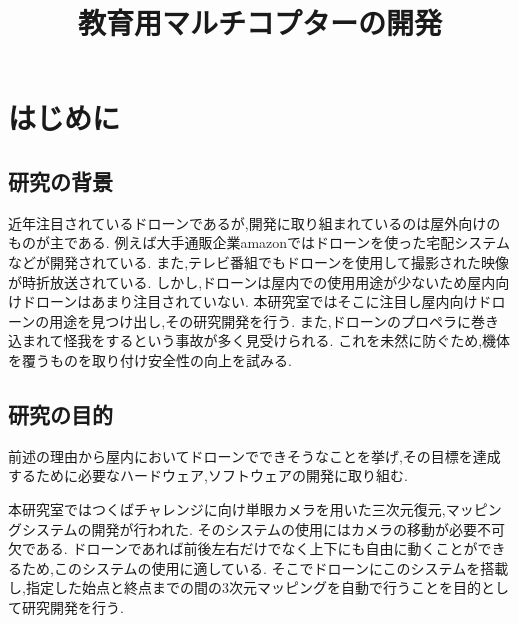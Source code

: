 \documentclass[a4paper]{jarticle}
\begin{document}
\title{教育用マルチコプターの開発}

\maketitle
\section{はじめに}

\subsection{研究の背景}
近年注目されているドローンであるが,開発に取り組まれているのは屋外向けのものが主である.
例えば大手通販企業amazonではドローンを使った宅配システムなどが開発されている.
また,テレビ番組でもドローンを使用して撮影された映像が時折放送されている.
しかし,ドローンは屋内での使用用途が少ないため屋内向けドローンはあまり注目されていない.
本研究室ではそこに注目し屋内向けドローンの用途を見つけ出し,その研究開発を行う.
また,ドローンのプロペラに巻き込まれて怪我をするという事故が多く見受けられる.
これを未然に防ぐため,機体を覆うものを取り付け安全性の向上を試みる.

\subsection{研究の目的}
前述の理由から屋内においてドローンでできそうなことを挙げ,その目標を達成するために必要なハードウェア,ソフトウェアの開発に取り組む.

本研究室ではつくばチャレンジに向け単眼カメラを用いた三次元復元,マッピングシステムの開発が行われた.
そのシステムの使用にはカメラの移動が必要不可欠である.
ドローンであれば前後左右だけでなく上下にも自由に動くことができるため,このシステムの使用に適している.
そこでドローンにこのシステムを搭載し,指定した始点と終点までの間の3次元マッピングを自動で行うことを目的として研究開発を行う.
\end{document}
